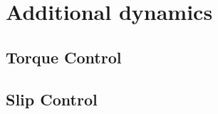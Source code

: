 \section{Additional dynamics}
\label{sec:AddDyn}
%
\subsection{Torque Control}
%
%
\subsection{Slip Control}
%
% 
